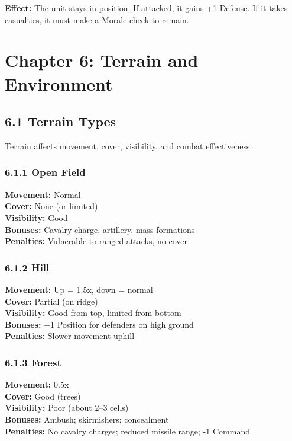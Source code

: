\documentclass[11pt]{article}
\begin{document}
\textbf{Effect:} The unit stays in position. If attacked, it gains +1 Defense. If it takes casualties, it must make a Morale check to remain.

\section{Chapter 6: Terrain and Environment}

\subsection{6.1 Terrain Types}

Terrain affects movement, cover, visibility, and combat effectiveness.

\subsubsection{6.1.1 Open Field}

\textbf{Movement:} Normal\\
\textbf{Cover:} None (or limited)\\
\textbf{Visibility:} Good\\
\textbf{Bonuses:} Cavalry charge, artillery, mass formations\\
\textbf{Penalties:} Vulnerable to ranged attacks, no cover

\subsubsection{6.1.2 Hill}

\textbf{Movement:} Up = 1.5x, down = normal\\
\textbf{Cover:} Partial (on ridge)\\
\textbf{Visibility:} Good from top, limited from bottom\\
\textbf{Bonuses:} +1 Position for defenders on high ground\\
\textbf{Penalties:} Slower movement uphill

\subsubsection{6.1.3 Forest}

\textbf{Movement:} 0.5x\\
\textbf{Cover:} Good (trees)\\
\textbf{Visibility:} Poor (about 2–3 cells)\\
\textbf{Bonuses:} Ambush; skirmishers; concealment\\
\textbf{Penalties:} No cavalry charges; reduced missile range; -1 Command
\end{document}
